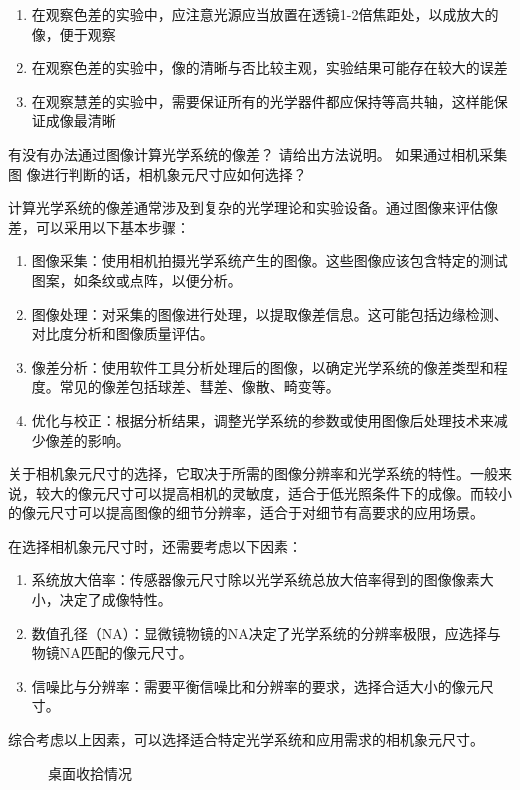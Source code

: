 \documentclass[dvipsnames, svgnames,a4paper,11pt]{article}
\begin{document}
	\begin{enumerate}
		\item 在观察色差的实验中，应注意光源应当放置在透镜1-2倍焦距处，以成放大的像，便于观察
		\item 在观察色差的实验中，像的清晰与否比较主观，实验结果可能存在较大的误差
		\item 在观察慧差的实验中，需要保证所有的光学器件都应保持等高共轴，这样能保证成像最清晰
	\end{enumerate}
\null






\begin{question}
	有没有办法通过图像计算光学系统的像差？ 请给出方法说明。 如果通过相机采集图
像进行判断的话，相机象元尺寸应如何选择？
\end{question}
	
计算光学系统的像差通常涉及到复杂的光学理论和实验设备。通过图像来评估像差，可以采用以下基本步骤：

\begin{enumerate}
	\item 图像采集：使用相机拍摄光学系统产生的图像。这些图像应该包含特定的测试图案，如条纹或点阵，以便分析。
	\item 图像处理：对采集的图像进行处理，以提取像差信息。这可能包括边缘检测、对比度分析和图像质量评估。
	\item 像差分析：使用软件工具分析处理后的图像，以确定光学系统的像差类型和程度。常见的像差包括球差、彗差、像散、畸变等。
	\item 优化与校正：根据分析结果，调整光学系统的参数或使用图像后处理技术来减少像差的影响。
\end{enumerate}

关于相机象元尺寸的选择，它取决于所需的图像分辨率和光学系统的特性。一般来说，较大的像元尺寸可以提高相机的灵敏度，适合于低光照条件下的成像。而较小的像元尺寸可以提高图像的细节分辨率，适合于对细节有高要求的应用场景。

在选择相机象元尺寸时，还需要考虑以下因素：

\begin{enumerate}
	\item 系统放大倍率：传感器像元尺寸除以光学系统总放大倍率得到的图像像素大小，决定了成像特性。
	\item 数值孔径（NA）：显微镜物镜的NA决定了光学系统的分辨率极限，应选择与物镜NA匹配的像元尺寸。
	\item 信噪比与分辨率：需要平衡信噪比和分辨率的要求，选择合适大小的像元尺寸。
\end{enumerate}

综合考虑以上因素，可以选择适合特定光学系统和应用需求的相机象元尺寸。
	


\begin{figure}[htbp]
	\centering
	\quad
	\caption{桌面收拾情况}
\end{figure}
\end{document}
